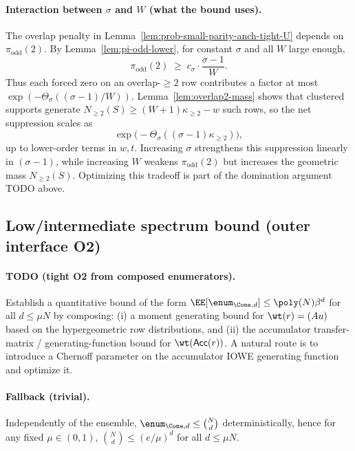 \paragraph{Interaction between $\sigma$ and $W$ (what the bound uses).}
The overlap penalty in Lemma~\ref{lem:prob-small-parity-anch-tight-U} depends on $\pi_{\mathrm{odd}}(2)$.
By Lemma~\ref{lem:pi-odd-lower}, for constant $\sigma$ and all $W$ large enough,
\[
\pi_{\mathrm{odd}}(2)\;\ge\; c_\sigma\cdot \frac{\sigma-1}{W}.
\]
Thus each forced zero on an overlap-$\ge 2$ row contributes a factor at most $\exp(-\Theta_\sigma((\sigma-1)/W))$.
Lemma~\ref{lem:overlap2-mass} shows that clustered supports generate
$N_{\ge 2}(S)\ge (W+1)\kappa_{\ge 2}-w$ such rows, so the net suppression scales as
\[
\exp\!\big(-\Theta_\sigma((\sigma-1)\kappa_{\ge 2})\big),
\]
up to lower-order terms in $w,t$.
Increasing $\sigma$ strengthens this suppression linearly in $(\sigma-1)$, while increasing $W$ weakens
$\pi_{\mathrm{odd}}(2)$ but increases the geometric mass $N_{\ge 2}(S)$.
Optimizing this tradeoff is part of the domination argument TODO above.

\subsection{Low/intermediate spectrum bound (outer interface O2)}
\label{subsec:outer-ea-spectrum}

\paragraph{TODO (tight O2 from composed enumerators).}
Establish a quantitative bound of the form
$\EE[\enum_{\Cone,d}]\le \poly(N)\beta^d$ for all $d\le \mu N$ by composing:
(i) a moment generating bound for $\wt(r)=(Au)$ based on the hypergeometric row distributions, and
(ii) the accumulator transfer-matrix / generating-function bound for $\wt({\sf Acc}(r))$.
A natural route is to introduce a Chernoff parameter on the accumulator IOWE generating function and optimize it.

\paragraph{Fallback (trivial).}
Independently of the ensemble, $\enum_{\Cone,d}\le \binom{N}{d}$ deterministically, hence for any fixed $\mu\in(0,1)$,
$\binom{N}{d}\le (e/\mu)^d$ for all $d\le \mu N$.


